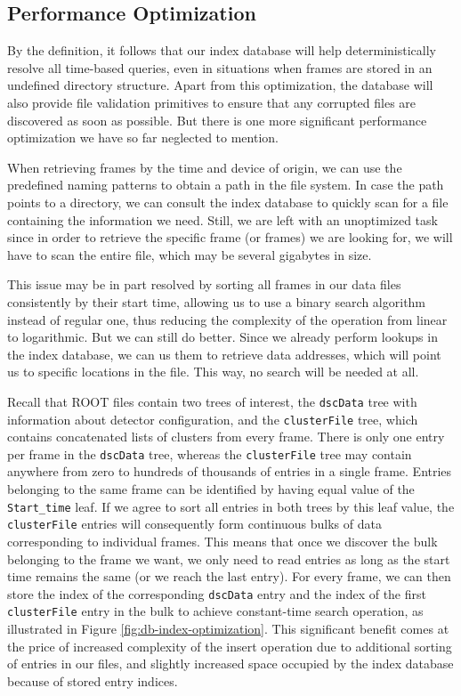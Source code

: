 \subsection{Performance Optimization}
\label{db:performance-optimization}
By the definition, it follows that our index database will help deterministically resolve all time-based queries, even in situations when frames are stored in an undefined directory structure. Apart from this optimization, the database will also provide file validation primitives to ensure that any corrupted files are discovered as soon as possible. But there is one more significant performance optimization we have so far neglected to mention.

When retrieving frames by the time and device of origin, we can use the predefined naming patterns to obtain a path in the file system. In case the path points to a directory, we can consult the index database to quickly scan for a file containing the information we need. Still, we are left with an unoptimized task since in order to retrieve the specific frame (or frames) we are looking for, we will have to scan the entire file, which may be several gigabytes in size.

This issue may be in part resolved by sorting all frames in our data files consistently by their start time, allowing us to use a binary search algorithm instead of regular one, thus reducing the complexity of the operation from linear to logarithmic. But we can still do better. Since we already perform lookups in the index database, we can us them to retrieve data addresses, which will point us to specific locations in the file. This way, no search will be needed at all.

Recall that ROOT files contain two trees of interest, the \texttt{dscData} tree with information about detector configuration, and the \texttt{clusterFile} tree, which contains concatenated lists of clusters from every frame. There is only one entry per frame in the \texttt{dscData} tree, whereas the \texttt{clusterFile} tree may contain anywhere from zero to hundreds of thousands of entries in a single frame. Entries belonging to the same frame can be identified by having equal value of the \texttt{Start\_time} leaf. If we agree to sort all entries in both trees by this leaf value, the \texttt{clusterFile} entries will consequently form continuous bulks of data corresponding to individual frames. This means that once we discover the bulk belonging to the frame we want, we only need to read entries as long as the start time remains the same (or we reach the last entry). For every frame, we can then store the index of the corresponding \texttt{dscData} entry and the index of the first \texttt{clusterFile} entry in the bulk to achieve constant-time search operation, as illustrated in Figure \ref{fig:db-index-optimization}. This significant benefit comes at the price of increased complexity of the insert operation due to additional sorting of entries in our files, and slightly increased space occupied by the index database because of stored entry indices.

